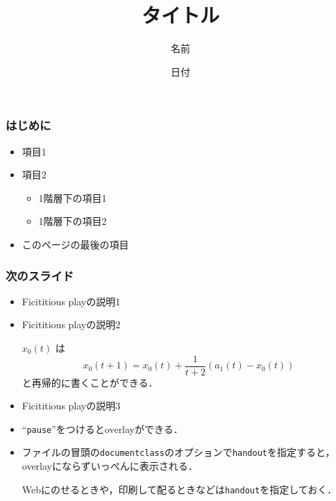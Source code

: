 \documentclass[dvipdfmx,fleqn]{beamer}
\title{\Large タイトル}
\author{\large 名前}
\date{\small 日付}
\begin{document}
\sffamily
\gtfamily


\begin{frame}
  \titlepage
  \thispagestyle{empty}
\end{frame}

\setcounter{framenumber}{0}




\begin{frame}
\frametitle{はじめに}
\begin{itemize}\setlength{\parskip}{0.5em}
\item
項目1

\item
項目2
 \begin{itemize}\setlength{\parskip}{0.5em}
 \item
 1階層下の項目1
 \item
 1階層下の項目2
 \end{itemize}

\item
このページの最後の項目
\end{itemize}
\end{frame}



\begin{frame}
\frametitle{次のスライド}
\begin{itemize}\setlength{\parskip}{0.5em}
\item
Ficititious playの説明1

\item
Ficititious playの説明2 \pause

$x_0(t)$ は
\[
x_0(t+1)
= x_0(t) + \frac{1}{t+2} (a_1(t) - x_0(t))
\]
と再帰的に書くことができる． \pause

\item
Ficititious playの説明3 \pause

\item
``\texttt{pause}''をつけるとoverlayができる．

\item
ファイルの冒頭の\texttt{documentclass}のオプションで\texttt{handout}を指定すると，
overlayにならずいっぺんに表示される．

Webにのせるときや，印刷して配るときなどは\texttt{handout}を指定しておく．

\end{itemize}
\end{frame}
\end{document}
